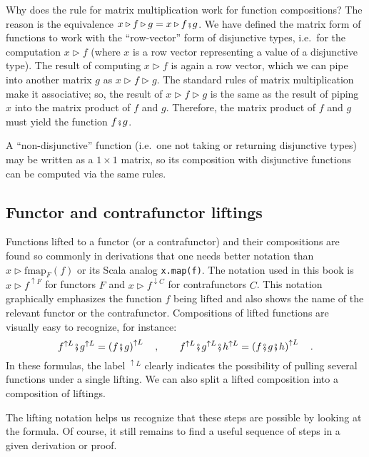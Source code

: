 Why does the rule for matrix multiplication work for function compositions?
The reason is the equivalence $x\triangleright f\triangleright g=x\triangleright f\bef g$.
We have defined the matrix form of functions to work with the \textsf{``}row-vector\textsf{''}
form of disjunctive types, i.e.~for the computation $x\triangleright f$
(where $x$ is a row vector representing a value of a disjunctive
type). The result of computing $x\triangleright f$ is again a row
vector, which we can pipe into another matrix $g$ as $x\triangleright f\triangleright g$.
The standard rules of matrix multiplication make it associative; so,
the result of $x\triangleright f\triangleright g$ is the same as
the result of piping $x$ into the matrix product of $f$ and $g$.
Therefore, the matrix product of $f$ and $g$ must yield the function
$f\bef g$.

A \textsf{``}non-disjunctive\textsf{''} function (i.e.~one not taking or returning
disjunctive types) may be written as a $1\times1$ matrix, so its
composition with disjunctive functions can be computed via the same
rules. 

\subsection{Functor and contrafunctor liftings}

Functions lifted to a functor (or a contrafunctor) and their compositions
are found so commonly in derivations that one needs better notation
than $x\triangleright\text{fmap}_{F}(f)$ or its Scala analog \lstinline!x.map(f)!.
The notation used in this book is $x\triangleright f^{\uparrow F}$
for functors $F$ and $x\triangleright f^{\downarrow C}$ for contrafunctors
$C$. This notation graphically emphasizes the function $f$ being
lifted and also shows the name of the relevant functor or the contrafunctor.
Compositions of lifted functions are visually easy to recognize, for
instance:
\[
f^{\uparrow L}\bef g^{\uparrow L}=\left(f\bef g\right)^{\uparrow L}\quad,\quad\quad f^{\uparrow L}\bef g^{\uparrow L}\bef h^{\uparrow L}=\left(f\bef g\bef h\right)^{\uparrow L}\quad.
\]
In these formulas, the label $^{\uparrow L}$ clearly indicates the
possibility of pulling several functions under a single lifting. We
can also split a lifted composition into a composition of liftings. 

The lifting notation helps us recognize that these steps are possible
by looking at the formula. Of course, it still remains to find a useful
sequence of steps in a given derivation or proof.


